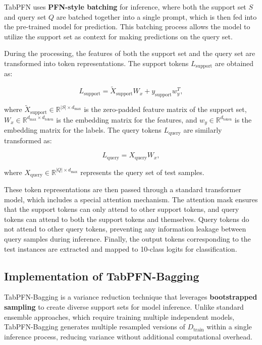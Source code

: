 TabPFN uses \textbf{PFN-style batching} for inference, where both the support set \( S \) and query set \( Q \) are batched together into a single prompt, which is then fed into the pre-trained model for prediction. This batching process allows the model to utilize the support set as context for making predictions on the query set.

During the processing, the features of both the support set and the query set are transformed into token representations. The support tokens \(L_{\text{support}}\) are obtained as:

\[
L_{\text{support}} = \tilde{X}_{\text{support}} W_x + y_{\text{support}} w_y^T,
\]

where \( \tilde{X}_{\text{support}} \in \mathbb{R}^{|S| \times d_{\max}} \) is the zero-padded feature matrix of the support set, \( W_x \in \mathbb{R}^{d_{\max} \times d_{\text{token}}} \) is the embedding matrix for the features, and \( w_y \in \mathbb{R}^{d_{\text{token}}} \) is the embedding matrix for the labels. The query tokens \(L_{\text{query}}\) are similarly transformed as:

\[
L_{\text{query}} = X_{\text{query}} W_x,
\]

where \( X_{\text{query}} \in \mathbb{R}^{|Q| \times d_{\max}} \) represents the query set of test samples.

These token representations are then passed through a standard transformer model, which includes a special attention mechanism. The attention mask ensures that the support tokens can only attend to other support tokens, and query tokens can attend to both the support tokens and themselves. Query tokens do not attend to other query tokens, preventing any information leakage between query samples during inference. Finally, the output tokens corresponding to the test instances are extracted and mapped to 10-class logits for classification.


\subsection{Implementation of TabPFN-Bagging}
\label{appendix:pfn-bagging}

TabPFN-Bagging is a variance reduction technique that leverages \textbf{bootstrapped sampling} to create diverse support sets for model inference. Unlike standard ensemble approaches, which require training multiple independent models, TabPFN-Bagging generates multiple resampled versions of \( D_{\text{train}} \) within a single inference process, reducing variance without additional computational overhead.

